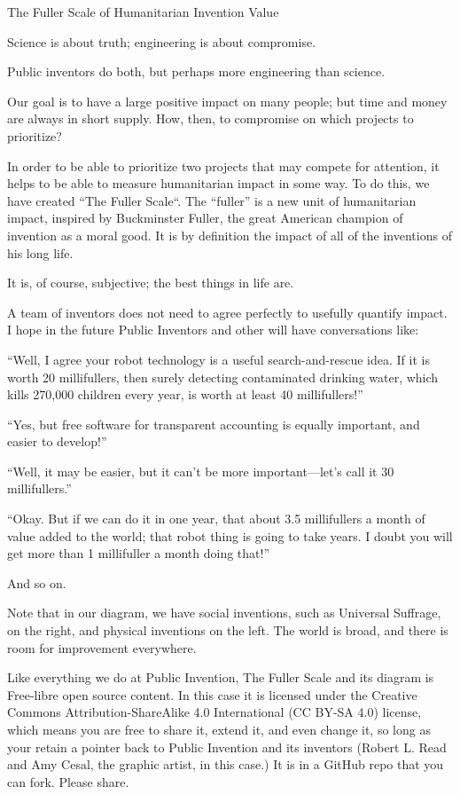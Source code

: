 \documentclass[
	fontsize=10pt, %
	twoside=false, %
	secnumdepth=1, %
]{kaobook}
\begin{document}
\begin{marginfigure}
  \caption{The Fuller Scale of Humanitarian Invention Value}
\end{marginfigure}

Science is about truth; engineering is about compromise.

Public inventors do both, but perhaps more engineering than
science.

Our goal is to have a large positive impact on many people; but time
and money are always in short supply.  How, then, to compromise on
which projects to prioritize?

In order to be able to prioritize two
projects that may compete for attention, it helps to be able to measure
humanitarian impact in some way.
To do this, we have created “The
Fuller Scale“. The “fuller” is a new unit of humanitarian impact,
inspired by Buckminster Fuller, the great American champion of
invention as a moral good. It is by definition the impact of all of
the inventions of his long life.

It is, of course, subjective; the best things in life are.

A team of inventors does not need to agree perfectly to usefully
quantify impact. I hope in the future Public Inventors and other will
have conversations like:

“Well, I agree your robot technology is a useful search-and-rescue
idea. If it is worth 20 millifullers, then surely detecting
contaminated drinking water, which kills 270,000 children every year,
is worth at least 40 millifullers!”

“Yes, but free software for transparent accounting is equally
important, and easier to develop!”

“Well, it may be easier, but it can’t be more important—let’s call it
30 millifullers.”

“Okay. But if we can do it in one year, that about 3.5 millifullers a
month of value added to the world; that robot thing is going to take
years. I doubt you will get more than 1 millifuller a month doing
that!”

And so on.

Note that in our diagram, we have social inventions, such as Universal
Suffrage, on the right, and physical inventions on the left. The world
is broad, and there is room for improvement everywhere.

Like everything we do at Public Invention, The Fuller Scale and its
diagram is Free-libre open source content.
In this case it is licensed
under the Creative Commons Attribution-ShareAlike 4.0 International
(CC BY-SA 4.0) license, which means you are free to share it, extend
it, and even change it, so long as your retain a pointer back to
Public Invention and its inventors (Robert L. Read and Amy Cesal, the
graphic artist, in this case.) It is in a GitHub repo that you can
fork. Please share.
\end{document}
